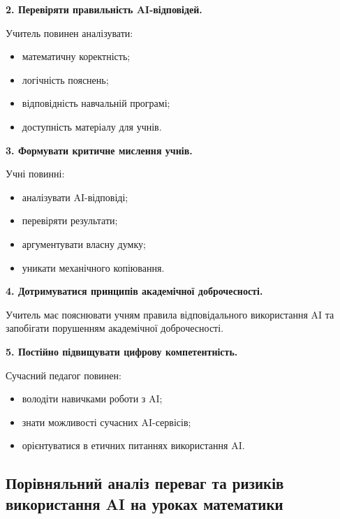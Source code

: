 \textbf{2. Перевіряти правильність AI-відповідей.}

Учитель повинен аналізувати:
\begin{itemize}
\item математичну коректність;
\item логічність пояснень;
\item відповідність навчальній програмі;
\item доступність матеріалу для учнів.
\end{itemize}

\textbf{3. Формувати критичне мислення учнів.}

Учні повинні:
\begin{itemize}
\item аналізувати AI-відповіді;
\item перевіряти результати;
\item аргументувати власну думку;
\item уникати механічного копіювання.
\end{itemize}

\textbf{4. Дотримуватися принципів академічної доброчесності.}

Учитель має пояснювати учням правила відповідального використання AI та запобігати порушенням академічної доброчесності.

\textbf{5. Постійно підвищувати цифрову компетентність.}

Сучасний педагог повинен:
\begin{itemize}
\item володіти навичками роботи з AI;
\item знати можливості сучасних AI-сервісів;
\item орієнтуватися в етичних питаннях використання AI.
\end{itemize}

\subsection{Порівняльний аналіз переваг та ризиків використання AI на уроках математики}

